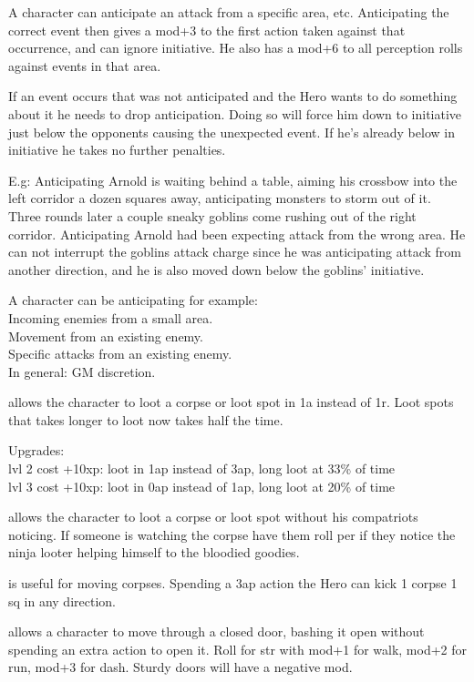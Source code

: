 A character can anticipate an attack from a specific area, etc. Anticipating the correct event then gives a mod+3 to the first action taken against that occurrence, and can ignore initiative. He also has a mod+6 to all perception rolls against events in that area.

If an event occurs that was not anticipated and the Hero wants to do something about it he needs to drop anticipation. Doing so will force him down to initiative just below the opponents causing the unexpected event. If he's already below in initiative he takes no further penalties.

E.g: Anticipating Arnold is waiting behind a table, aiming his crossbow into the left corridor a dozen squares away, anticipating monsters to storm out of it. Three rounds later a couple sneaky goblins come rushing out of the right corridor. Anticipating Arnold had been expecting attack from the wrong area. He can not interrupt the goblins attack charge since he was anticipating attack from another direction, and he is also moved down below the goblins' initiative.

A character can be anticipating for example: \\
Incoming enemies from a small area. \\
Movement from an existing enemy. \\
Specific attacks from an existing enemy. \\
In general: GM discretion.


 allows the character to loot a corpse or loot spot in 1a instead of 1r. Loot spots that takes longer to loot now takes half the time.

Upgrades:\\
lvl 2 cost +10xp: loot in 1ap instead of 3ap, long loot at 33\% of time\\
lvl 3 cost +10xp: loot in 0ap instead of 1ap, long loot at 20\% of time


 allows the character to loot a corpse or loot spot without his compatriots noticing. If someone is watching the corpse have them roll per if they notice the ninja looter helping himself to the bloodied goodies.


 is useful for moving corpses. Spending a 3ap action the Hero can kick 1 corpse 1 sq in any direction.


 allows a character to move through a closed door, bashing it open without spending an extra action to open it. Roll for str with mod+1 for walk, mod+2 for run, mod+3 for dash. Sturdy doors will have a negative mod.

